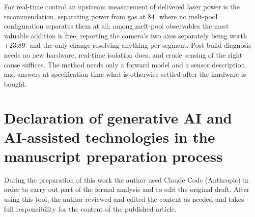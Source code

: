 \documentclass[final,5p,times,twocolumn]{elsarticle}
\begin{document}
For real-time control an upstream measurement of delivered laser power is the
recommendation, separating power from gas at $84^\circ$ where no melt-pool
configuration separates them at all; among melt-pool observables the most
valuable addition is free, reporting the camera's two axes separately being worth
$+23.89^\circ$ and the only change resolving anything per segment. Post-build
diagnosis needs no new hardware, real-time isolation does, and crude sensing of
the right cause suffices. The method needs only a forward model and a sensor
description, and answers at specification time what is otherwise settled after
the hardware is bought.

\section*{Declaration of generative AI and AI-assisted technologies in the
manuscript preparation process}

During the preparation of this work the author used Claude Code (Anthropic) in
order to carry out part of the formal analysis and to edit the original draft. After using
this tool, the author reviewed and edited the content as needed and takes full
responsibility for the content of the published article.
\end{document}
